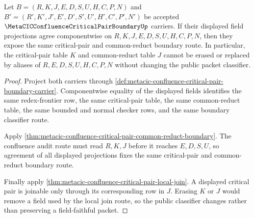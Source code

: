 \begin{theorem}
\label{thm:metacic-confluence-critical-pair-fieldfaithful-prediction}
Let $B=(R,K,J,E,D,S,U,H,C,P,N)$ and $B'=(R',K',J',E',D',S',U',H',C',P',N')$ be accepted $\MetaCICConfluenceCriticalPairBoundaryUp$ carriers. If their displayed field projections agree componentwise on $R,K,J,E,D,S,U,H,C,P,N$, then they expose the same critical-pair and common-reduct boundary route. In particular, the critical-pair table $K$ and common-reduct table $J$ cannot be erased or replaced by aliases of $R,E,D,S,U,H,C,P,N$ without changing the public packet classifier.
\end{theorem}
\begin{proof}
Project both carriers through \autoref{def:metacic-confluence-critical-pair-boundary-carrier}. Componentwise equality of the displayed fields identifies the same redex-frontier row, the same critical-pair table, the same common-reduct table, the same bounded and normal checker rows, and the same boundary classifier route.

Apply \autoref{thm:metacic-confluence-critical-pair-common-reduct-boundary}. The confluence audit route must read $R,K,J$ before it reaches $E,D,S,U$, so agreement of all displayed projections fixes the same critical-pair and common-reduct boundary route.

Finally apply \autoref{thm:metacic-confluence-critical-pair-local-join}. A displayed critical pair is joinable only through its corresponding row in $J$. Erasing $K$ or $J$ would remove a field used by the local join route, so the public classifier changes rather than preserving a field-faithful packet.
\end{proof}

